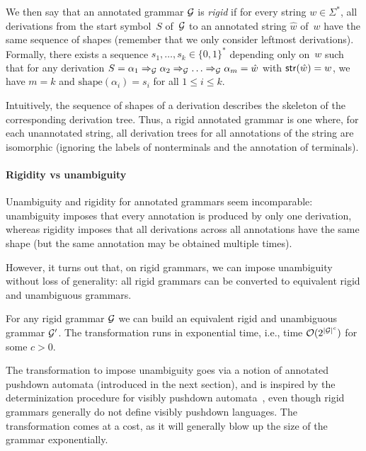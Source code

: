 We then say that an annotated grammar $\mathcal{G}$ is \emph{rigid}
%
%
        if for every string
        $w \in \Sigma^*$, all derivations from the start symbol~$S$ of~$\mathcal{G}$ to
        an annotated string $\hat{w}$ of~$w$ have the same sequence of shapes
        (remember that we only consider leftmost derivations).
        Formally, there exists a sequence $s_1, \ldots, s_k \in \{0,
        1\}^*$ depending only on~$w$ such that for any derivation 
        $S = \alpha_1 \Rightarrow_{\mathcal{G}} \alpha_2 \Rightarrow_{\mathcal{G}} \ldots \Rightarrow_{\mathcal{G}} \alpha_m =
        \hat{w}$ with $\mathsf{str}(\hat{w}) = w$, we have $m = k$ and $\mathrm{shape}(\alpha_i) = s_i$ for all $1
        \leq i \leq k$.
%

Intuitively, the sequence of shapes of a derivation describes the
skeleton of the corresponding derivation tree. Thus, a rigid annotated
grammar is one where, for each unannotated string, all derivation trees for all
annotations of the string are isomorphic (ignoring the labels of 
nonterminals and the annotation of terminals).










\paragraph{Rigidity vs unambiguity}
Unambiguity and rigidity for annotated grammars seem
incomparable: unambiguity imposes that every annotation is produced by only one
derivation, whereas rigidity imposes that all derivations across all annotations
have the same shape (but the same annotation may be obtained multiple times).

However, it turns out that, on rigid grammars, we can impose unambiguity without
loss of generality: all rigid grammars can be converted to equivalent rigid and
unambiguous grammars.

\begin{theorem}
  \label{thm:profileu-iou} For any rigid grammar
	$\mathcal{G}$ we can build an equivalent rigid and
	unambiguous grammar $\mathcal{G}'$. The transformation runs in exponential time,
        i.e., time $\mathcal{O}(2^{|\mathcal{G}|^c})$ for some $c> 0$.
\end{theorem}

The transformation to impose unambiguity goes via a notion of annotated pushdown
automata (introduced in the next section), and is inspired by the
determinization procedure for visibly pushdown automata~\cite{alur2004visibly}, even though rigid
grammars generally do not define visibly pushdown languages. The transformation
comes at a cost, as it will generally blow up the size of the grammar
exponentially.



